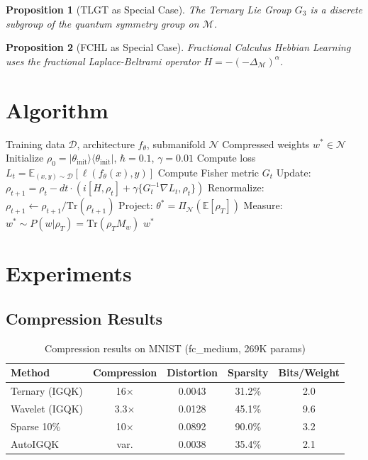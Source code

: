 \documentclass[11pt,a4paper]{article}
\newtheorem{proposition}{Proposition}
\begin{document}
\begin{proposition}[TLGT as Special Case]
The Ternary Lie Group $G_3$ is a discrete subgroup of the quantum symmetry group on $\mathcal{M}$.
\end{proposition}

\begin{proposition}[FCHL as Special Case]
Fractional Calculus Hebbian Learning uses the fractional Laplace-Beltrami operator $H = -(-\Delta_\mathcal{M})^\alpha$.
\end{proposition}

\section{Algorithm}

\begin{algorithm}[h]
\caption{IGQK Training Algorithm}
\begin{algorithmic}[1]
\REQUIRE Training data $\mathcal{D}$, architecture $f_\theta$, submanifold $\mathcal{N}$
\ENSURE Compressed weights $w^* \in \mathcal{N}$
\STATE Initialize $\rho_0 = |\theta_{\text{init}}\rangle\langle\theta_{\text{init}}|$, $\hbar = 0.1$, $\gamma = 0.01$
    \STATE Compute loss $L_t = \mathbb{E}_{(x,y) \sim \mathcal{D}}[\ell(f_\theta(x), y)]$
    \STATE Compute Fisher metric $G_t$
    \STATE Update: $\rho_{t+1} = \rho_t - dt \cdot (i[H, \rho_t] + \gamma\{G_t^{-1}\nabla L_t, \rho_t\})$
    \STATE Renormalize: $\rho_{t+1} \leftarrow \rho_{t+1} / \text{Tr}(\rho_{t+1})$
\ENDFOR
\STATE Project: $\theta^* = \Pi_\mathcal{N}(\mathbb{E}[\rho_T])$
\STATE Measure: $w^* \sim P(w|\rho_T) = \text{Tr}(\rho_T M_w)$
\RETURN $w^*$
\end{algorithmic}
\end{algorithm}

\section{Experiments}

\subsection{Compression Results}

\begin{table}[h]
\centering
\caption{Compression results on MNIST (fc\_medium, 269K params)}
\begin{tabular}{lcccc}
\toprule
Method & Compression & Distortion & Sparsity & Bits/Weight \\
\midrule
Ternary (IGQK) & 16$\times$ & 0.0043 & 31.2\% & 2.0 \\
Wavelet (IGQK) & 3.3$\times$ & 0.0128 & 45.1\% & 9.6 \\
Sparse 10\% & 10$\times$ & 0.0892 & 90.0\% & 3.2 \\
AutoIGQK & var. & 0.0038 & 35.4\% & 2.1 \\
\bottomrule
\end{tabular}
\label{tab:results}
\end{table}
\end{document}
